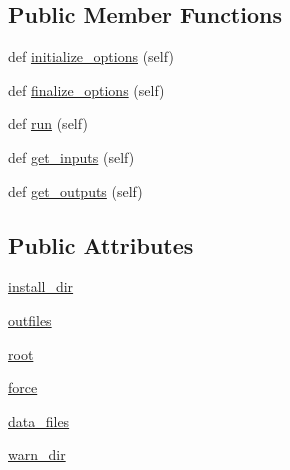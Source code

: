 \subsection*{Public Member Functions}
\begin{DoxyCompactItemize}
\item 
def \hyperlink{classsetuptools_1_1__distutils_1_1command_1_1install__data_1_1install__data_a6d18be4b5fcc33dc42511721f63076bb}{initialize\+\_\+options} (self)
\item 
def \hyperlink{classsetuptools_1_1__distutils_1_1command_1_1install__data_1_1install__data_a2a7d1b6ff96d28f0f5b0a781c4e78d5d}{finalize\+\_\+options} (self)
\item 
def \hyperlink{classsetuptools_1_1__distutils_1_1command_1_1install__data_1_1install__data_a9f01aae358d140440d2b962ca9dc46ea}{run} (self)
\item 
def \hyperlink{classsetuptools_1_1__distutils_1_1command_1_1install__data_1_1install__data_ab6333172a9187cc3eab2ac69eed757c2}{get\+\_\+inputs} (self)
\item 
def \hyperlink{classsetuptools_1_1__distutils_1_1command_1_1install__data_1_1install__data_a8bd8478855f8ac72473e1ec8198ad724}{get\+\_\+outputs} (self)
\end{DoxyCompactItemize}
\subsection*{Public Attributes}
\begin{DoxyCompactItemize}
\item 
\hyperlink{classsetuptools_1_1__distutils_1_1command_1_1install__data_1_1install__data_a20cd227ed4a684bf7b3a865c23f44a1d}{install\+\_\+dir}
\item 
\hyperlink{classsetuptools_1_1__distutils_1_1command_1_1install__data_1_1install__data_a76f0906c4859d12964ac533f7528bc98}{outfiles}
\item 
\hyperlink{classsetuptools_1_1__distutils_1_1command_1_1install__data_1_1install__data_ac4928a337428d63bf3e8337d30fb0107}{root}
\item 
\hyperlink{classsetuptools_1_1__distutils_1_1command_1_1install__data_1_1install__data_a5b5c7501b2c860eab3d2829638ee97e3}{force}
\item 
\hyperlink{classsetuptools_1_1__distutils_1_1command_1_1install__data_1_1install__data_a929af3b5292d3c501f1e31018a7e275f}{data\+\_\+files}
\item 
\hyperlink{classsetuptools_1_1__distutils_1_1command_1_1install__data_1_1install__data_ab924867fbab065d8880774778ff251a9}{warn\+\_\+dir}
\end{DoxyCompactItemize}
